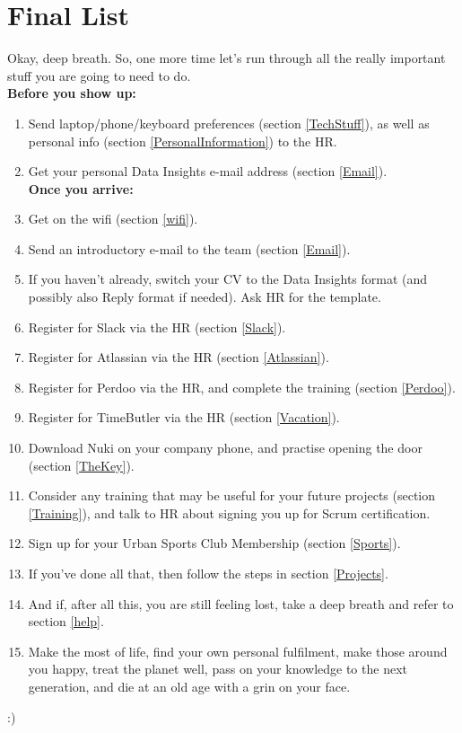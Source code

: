 \documentclass[11pt]{report}
\begin{document}
\chapter{Final List}
Okay, deep breath. So, one more time let's run through all the really important stuff you are going to need to do.\\

\noindent \textbf{Before you show up:}
\begin{enumerate}
\item Send laptop/phone/keyboard preferences (section \ref{TechStuff}), as well as personal info (section \ref{PersonalInformation}) to the HR.
\item Get your personal Data Insights e-mail address (section \ref{Email}).\\

\hspace{-0.95cm}\textbf{Once you arrive:}
\item Get on the wifi (section \ref{wifi}).
\item Send an introductory e-mail to the team (section \ref{Email}).
\item If you haven't already, switch your CV to the Data Insights format (and possibly also Reply format if needed). Ask HR for the template.
\item Register for Slack via the HR (section \ref{Slack}).
\item Register for Atlassian via the HR (section \ref{Atlassian}).
\item Register for Perdoo via the HR, and complete the training (section \ref{Perdoo}).
\item Register for TimeButler via the HR (section \ref{Vacation}).
\item Download Nuki on your company phone, and practise opening the door (section \ref{TheKey}).
\item Consider any training that may be useful for your future projects (section \ref{Training}), and talk to HR about signing you up for Scrum certification.
\item Sign up for your Urban Sports Club Membership (section \ref{Sports}).
\item If you've done all that, then follow the steps in section \ref{Projects}.
\item And if, after all this, you are still feeling lost, take a deep breath and refer to section \ref{help}.
\item Make the most of life, find your own personal fulfilment, make those around you happy, treat the planet well, pass on your knowledge to the next generation, and die at an old age with a grin on your face.
\end{enumerate}
\vspace{1cm}
\begin{center}
:)
\end{center}
\end{document}
